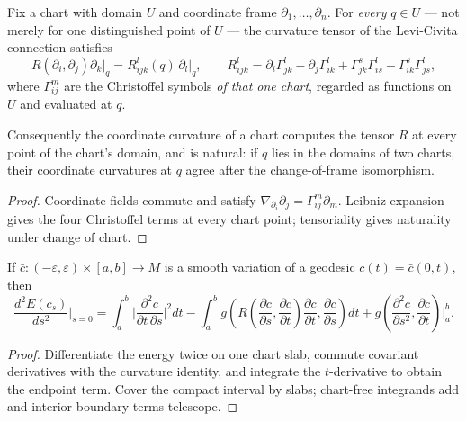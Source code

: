 \begin{lemma}
  \label{lem:pet-ch6-offdiagonal-curvature-bridge}


  Fix a chart with domain $U$ and coordinate frame $\partial_1,\dots,\partial_n$.
  For \emph{every} $q\in U$ — not merely for one distinguished point of $U$ — the
  curvature tensor of the Levi-Civita connection satisfies
  \[
    R(\partial_i,\partial_j)\partial_k\big|_q=R^l_{ijk}(q)\,\partial_l\big|_q,
    \qquad
    R^l_{ijk}=\partial_i\Gamma^l_{jk}-\partial_j\Gamma^l_{ik}
      +\Gamma^s_{jk}\Gamma^l_{is}-\Gamma^s_{ik}\Gamma^l_{js},
  \]
  where $\Gamma^m_{ij}$ are the Christoffel symbols \emph{of that one chart},
  regarded as functions on $U$ and evaluated at $q$.

  Consequently the coordinate curvature of a chart computes the tensor $R$ at every
  point of the chart's domain, and is natural: if $q$ lies in the domains of two
  charts, their coordinate curvatures at $q$ agree after the change-of-frame
  isomorphism.
\end{lemma}
\begin{proof}

  \sketch
  Coordinate fields commute and satisfy \(\nabla_{\partial_i}\partial_j=\Gamma^m_{ij}\partial_m\). Leibniz expansion gives the four Christoffel terms at every chart point; tensoriality gives naturality under change of chart.
\end{proof}

\begin{theorem}
  \label{thm:pet-ch6-synge-second-variation}


  If $\bar c:(-\varepsilon,\varepsilon)\times[a,b]\to M$ is a smooth variation
  of a geodesic $c(t)=\bar c(0,t)$, then
  \[
    \frac{d^2E(c_s)}{ds^2}\bigg|_{s=0}
    =\int_a^b\Big|\frac{\partial^2c}{\partial t\,\partial s}\Big|^2dt
    -\int_a^bg\!\left(R\!\left(\frac{\partial c}{\partial s},\frac{\partial c}{\partial t}\right)
    \frac{\partial c}{\partial t},\frac{\partial c}{\partial s}\right)dt
    +g\!\left(\frac{\partial^2c}{\partial s^2},\frac{\partial c}{\partial t}\right)\bigg|_a^b.
  \]
\end{theorem}
\begin{proof}

  \sketch
  Differentiate the energy twice on one chart slab, commute covariant derivatives with the curvature identity, and integrate the \(t\)-derivative to obtain the endpoint term. Cover the compact interval by slabs; chart-free integrands add and interior boundary terms telescope.
\end{proof}

